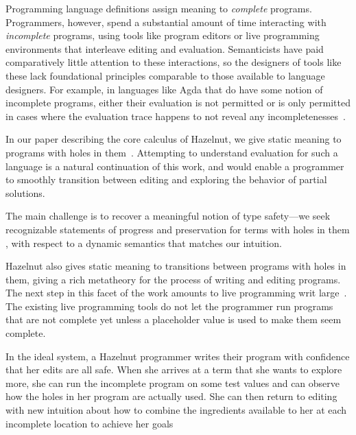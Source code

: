 Programming language definitions assign meaning to \textit{complete}
programs. Programmers, however, spend a substantial amount of time
interacting with \textit{incomplete} programs, using tools like program
editors or live programming environments that interleave editing and
evaluation. Semanticists have paid comparatively little attention to these
interactions, so the designers of tools like these lack foundational
principles comparable to those available to language designers. For
example, in languages like Agda that do have some notion of incomplete
programs, either their evaluation is not permitted or is only permitted in
cases where the evaluation trace happens to not reveal any
incompletenesses~\cite{norell:thesis}.

In our paper describing the core calculus of Hazelnut, we give static
meaning to programs with holes in them~\cite{DBLP:journals/corr/OmarVHAH16}.
Attempting to understand evaluation for such a language is a natural
continuation of this work, and would enable a programmer to smoothly
transition between editing and exploring the behavior of partial solutions.

The main challenge is to recover a meaningful notion of type safety---we
seek recognizable statements of progress and preservation for terms with
holes in them , with respect to a dynamic semantics that matches our
intuition.

Hazelnut also gives static meaning to  transitions between programs with
holes in them, giving a rich metatheory for the process of writing and
editing programs. The next step in this facet of the work amounts to live
programming writ large~\cite{burckhardt2013s}. The existing live
programming tools do not let the programmer run programs that are not complete
yet unless a placeholder value is used to make them seem complete.

In the ideal system, a Hazelnut programmer writes their
program with confidence that her edits are all safe. When she arrives at a
term that she wants to explore more, she can run the incomplete program on
some test values and can observe how the holes in her program are actually
used. She can then return to editing with new intuition about how to
combine the ingredients available to her at each incomplete location to
achieve her goals 
